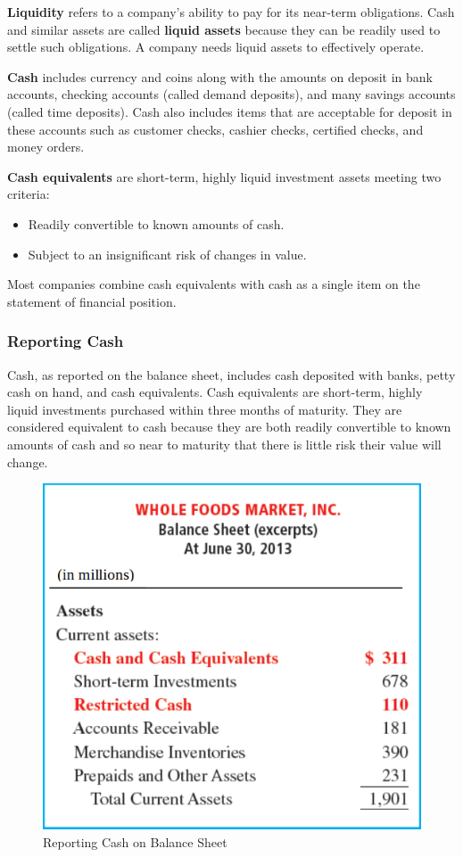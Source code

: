 \documentclass[../main.tex]{subfiles}
\begin{document}
	\textbf{Liquidity} refers to a company’s ability 
	to pay for its near-term obligations. Cash and similar assets are called 
	\textbf{liquid assets} because they can be readily used to settle such 
	obligations. A company needs liquid assets to effectively operate. 
	
	\textbf{Cash} includes currency and coins along with the amounts on deposit 
	in bank 
	accounts, checking accounts (called demand deposits), and many savings 
	accounts (called time deposits). Cash also includes items that are 
	acceptable for deposit in these accounts such as customer checks, cashier 
	checks, certified checks, and money orders. 
	
	\textbf{Cash equivalents} are short-term, highly liquid investment assets 
	meeting 
	two criteria:
	\begin{itemize}[noitemsep]
		\item Readily convertible to known amounts of cash.
		\item Subject to an insignificant risk of changes in value.
	\end{itemize}
	Most companies combine cash equivalents with cash as a single item on the 
	statement of financial position. 
	
	\subsubsection{Reporting Cash}
	
	Cash, as reported on the balance sheet, includes cash deposited with banks, 
	petty cash on hand, and cash equivalents. Cash equivalents are short-term, 
	highly liquid investments purchased within three months of maturity. They 
	are considered equivalent to cash because they are both readily convertible 
	to known amounts of cash and so near to maturity that there is little risk 
	their value will change. 
	
	\begin{figure}[ht]
		\centering
		\includegraphics[width=0.7\columnwidth]{images/c5/reporting_cash.png}
		\caption{Reporting Cash on Balance Sheet}
	\end{figure}
	
\end{document}
